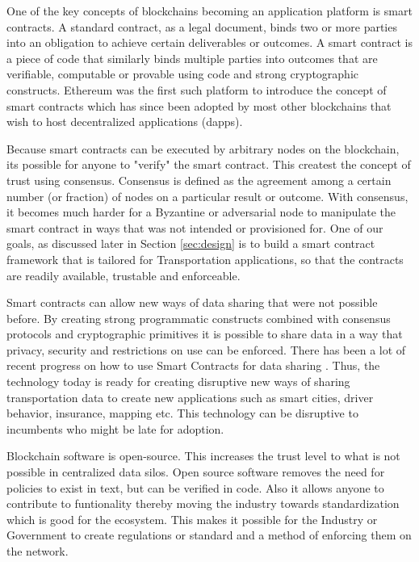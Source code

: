One of the key concepts of blockchains becoming an application platform is smart contracts. A standard contract, as a
legal document, binds two or more parties into an obligation to achieve certain deliverables or outcomes. A smart
contract is a piece of code that similarly binds multiple parties into outcomes that are verifiable, computable or
provable using code and strong cryptographic constructs. Ethereum was the first such platform to introduce the concept
of smart contracts which has since been adopted by most other blockchains that wish to host decentralized applications
(dapps).

Because smart contracts can be executed by arbitrary nodes on the blockchain, its possible for anyone to "verify" the
smart contract. This createst the concept of trust using consensus. Consensus is defined as the agreement among a
certain number (or fraction) of nodes on a particular result or outcome. With consensus, it becomes much harder for a
Byzantine or adversarial node \cite{lamport_byz} to manipulate the smart contract in ways that was not intended or
provisioned for. One of our goals, as discussed later in Section \ref{sec:design} is to build a smart contract framework
that is tailored for Transportation applications, so that the contracts are readily available, trustable and
enforceable. 

Smart contracts can allow new ways of data sharing that were not possible before. By creating strong programmatic
constructs combined with consensus protocols and cryptographic primitives it is possible to share data in a way that
privacy, security and restrictions on use can be enforced. There has been a lot of recent progress on how to use Smart
Contracts for data sharing \cite{liu_2018}. Thus, the technology today is ready for creating disruptive new ways of
sharing transportation data to create new applications such as smart cities, driver behavior, insurance, mapping etc.
This technology can be disruptive to incumbents who might be late for adoption.

Blockchain software is open-source. This increases the trust level to what is not possible in centralized data silos.
Open source software removes the need for policies to exist in text, but can be verified in code. Also it allows anyone
to contribute to funtionality thereby moving the industry towards standardization which is good for the ecosystem. This
makes it possible for the Industry or Government to create regulations or standard and a method of enforcing them on the
network.

